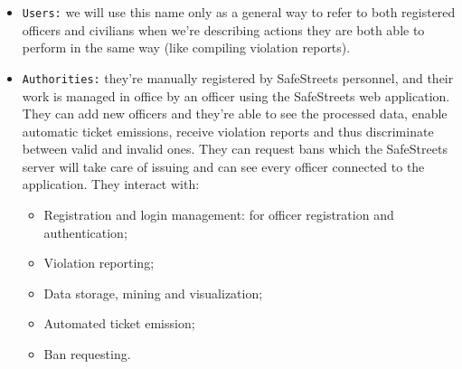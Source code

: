 \documentclass[12pt,a4paper]{article}
\begin{document}
\begin{itemize}
\item \texttt{Users:} we will use this name only as a general way to refer to both registered officers and civilians when we're describing actions they are both able to perform in the same way (like compiling violation reports).

\item  \texttt{Authorities:} they're manually registered by SafeStreets personnel, and their work is managed in office by an officer using the SafeStreets web application. They can add new officers and they're able to see the processed data, enable automatic ticket emissions, receive violation reports and thus discriminate between valid and invalid ones. They can request bans which the SafeStreets server will take care of issuing and can see every officer connected to the application. They interact with: 
		\begin{itemize}
			\item Registration and login management: for officer registration and authentication;
			\item Violation reporting;
			\item Data storage, mining and visualization;
			\item Automated ticket emission;
			\item Ban requesting.
		\end{itemize}

\end{itemize}
\newpage
\end{document}
